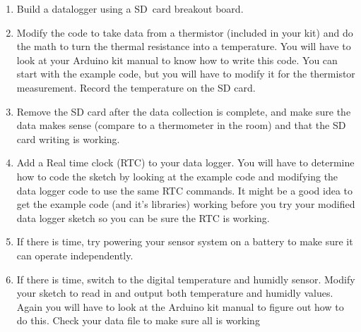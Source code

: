 \begin{enumerate}
\item Build a datalogger using a SD\ card breakout board.

\item Modify the code to take data from a thermistor (included in your kit) and do the math to turn the thermal resistance into a temperature. You will have to look at your Arduino kit manual to know how to write this code. You can start with the example code, but you will have to modify it for the thermistor measurement. Record the temperature on the SD card.

\item Remove the SD card after the data collection is complete, and make sure the data makes sense (compare to a thermometer in the room) and that the SD card writing is working.

\item Add a Real time clock (RTC) to your data logger. You will have to determine how to code the sketch by looking at the example code and modifying the data logger code to use the same RTC commands. It might be a good idea to get the example code (and it's libraries) working before you try your modified data logger sketch so you can be sure the RTC is working.

\item If there is time, try powering your sensor system on a battery to make sure it can operate independently.

\item If there is time, switch to the digital temperature and humidly sensor. Modify your sketch to read in and output both temperature and humidly values. Again you will have to look at the Arduino kit manual to figure out how to do this. Check your data file to make sure all is working
\end{enumerate}


